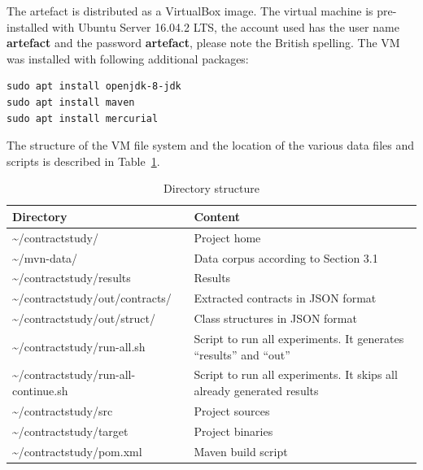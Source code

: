 \documentclass[a4paper,UKenglish]{darts}
\begin{document}
\begin{content}
	
	
The artefact is distributed as a VirtualBox image. The virtual machine is pre-installed with Ubuntu Server 16.04.2 LTS, the account used has the user name \textbf{artefact} and the password \textbf{artefact}, please note the British spelling. The VM was installed with following additional packages:

\begin{verbatim}
sudo apt install openjdk-8-jdk
sudo apt install maven
sudo apt install mercurial 
\end{verbatim}

The structure of the VM file system and the location of the various data files and scripts is described in Table~\ref{tab:structure}.

\begin{table}[t]
	\centering
	\caption{Directory structure}
	\label{tab:structure}
	\begin{tabular}{p{6cm} p{8cm} } \hline
		Directory & Content \\ \hline
		\textasciitilde/contractstudy/ & Project home \\
		\textasciitilde/mvn-data/  & Data corpus according to Section 3.1 \\
		\textasciitilde/contractstudy/results & Results \\
		\textasciitilde/contractstudy/out/contracts/ & Extracted contracts in JSON format \\
		\textasciitilde/contractstudy/out/struct/ & Class structures in JSON format \\
		\textasciitilde/contractstudy/run-all.sh & Script to run all experiments. It generates “results” and “out”  \\
		\textasciitilde/contractstudy/run-all-continue.sh & Script to run all experiments. It skips all already generated results \\
		\textasciitilde/contractstudy/src & Project sources  \\
		\textasciitilde/contractstudy/target & Project binaries  \\
		\textasciitilde/contractstudy/pom.xml & Maven build script  \\
		\hline
	\end{tabular}
\end{table}



\end{content} 
\end{document}
